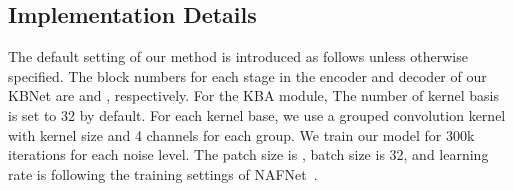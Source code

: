 \documentclass[default,iicol]{sn-jnl}
\theoremstyle{thmstyleone}\newtheorem{theorem}{Theorem}\newtheorem{proposition}[theorem]{Proposition}
\theoremstyle{thmstyletwo}\newtheorem{example}{Example}\newtheorem{remark}{Remark}
\theoremstyle{thmstylethree}\newtheorem{definition}{Definition}
\begin{document}
\subsection{Implementation Details}\label{sec:implementation}
The default setting of our method is introduced as follows unless otherwise specified. The block numbers for each stage in the encoder and decoder of our KBNet are  and , respectively.
For the KBA module, The number of kernel basis is set to 32 by default. For each kernel base, we use a grouped convolution kernel with kernel size  and 4 channels for each group.
 We train our model for 300k iterations for each noise level. The patch size is , batch size is 32, and learning rate is  following the training settings of NAFNet~\cite{chen2022nafnet}.

\renewcommand{\arraystretch}{1.} 
\end{document}
